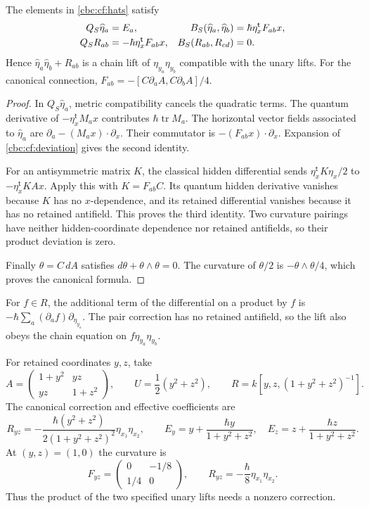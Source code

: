 \begin{lemma}\label{cbc:cf:pair}
The elements in \eqref{cbc:cf:hats} satisfy
\begin{align}
 Q_S\widehat\eta_a&=E_a,&
 B_S(\widehat\eta_a,\widehat\eta_b)
       &=\hbar\eta_x^{\mathsf t}F_{ab}x,\notag\\
 Q_SR_{ab}&=-\hbar\eta_x^{\mathsf t}F_{ab}x,&
 B_S(R_{ab},R_{cd})&=0.
 \label{cbc:cf:pair-identities}
\end{align}
Hence $\widehat\eta_a\widehat\eta_b+R_{ab}$ is a chain
lift of $\eta_{y_a}\eta_{y_b}$ compatible with the unary
lifts. For the canonical connection,
$F_{ab}=-[C\partial_aA,C\partial_bA]/4$.
\end{lemma}
\begin{proof}
In $Q_S\widehat\eta_a$, metric compatibility cancels the
quadratic terms. The quantum derivative of
$-\eta_x^{\mathsf t}M_ax$ contributes
$\hbar\operatorname{tr}M_a$. The horizontal vector fields
associated to $\widehat\eta_a$ are
$\partial_a-(M_ax)\cdot\partial_x$. Their commutator is
$-(F_{ab}x)\cdot\partial_x$. Expansion of
\eqref{cbc:cf:deviation} gives the second identity.

For an antisymmetric matrix $K$, the classical hidden
differential sends $\eta_x^{\mathsf t}K\eta_x/2$ to
$-\eta_x^{\mathsf t}KAx$. Apply this with $K=F_{ab}C$.
Its quantum hidden derivative vanishes because $K$ has no
$x$-dependence, and its retained differential vanishes because
it has no retained antifield. This proves the third identity.
Two curvature pairings have neither hidden-coordinate dependence
nor retained antifields, so their product deviation is zero.

Finally $\theta=C\,dA$ satisfies
$d\theta+\theta\wedge\theta=0$.
The curvature of $\theta/2$ is $-\theta\wedge\theta/4$,
which proves the canonical formula.
\end{proof}

For $f\in R$, the additional term of the differential on a
product by $f$ is
$-\hbar\sum_a(\partial_af)\partial_{\eta_{y_a}}$.
The pair correction has no retained antifield, so the lift
also obeys the chain equation on $f\eta_{y_a}\eta_{y_b}$.

\begin{example}\label{cbc:cf:curved-example}
For retained coordinates $y,z$, take
\[
 A=\begin{pmatrix}1+y^2&yz\\yz&1+z^2\end{pmatrix},
 \qquad U=\frac12(y^2+z^2),\qquad
 R=k[y,z,(1+y^2+z^2)^{-1}].
\]
The canonical correction and effective coefficients are
\[
 R_{yz}=-\frac{\hbar(y^2+z^2)}
                   {2(1+y^2+z^2)^2}\eta_{x_1}\eta_{x_2},
 \qquad
 E_y=y+\frac{\hbar y}{1+y^2+z^2},\quad
 E_z=z+\frac{\hbar z}{1+y^2+z^2}.
\]
At $(y,z)=(1,0)$ the curvature is
\[
 F_{yz}=\begin{pmatrix}0&-1/8\\1/4&0\end{pmatrix},
 \qquad R_{yz}=-\frac{\hbar}{8}\eta_{x_1}\eta_{x_2}.
\]
Thus the product of the two specified unary lifts needs a
nonzero correction.
\end{example}

